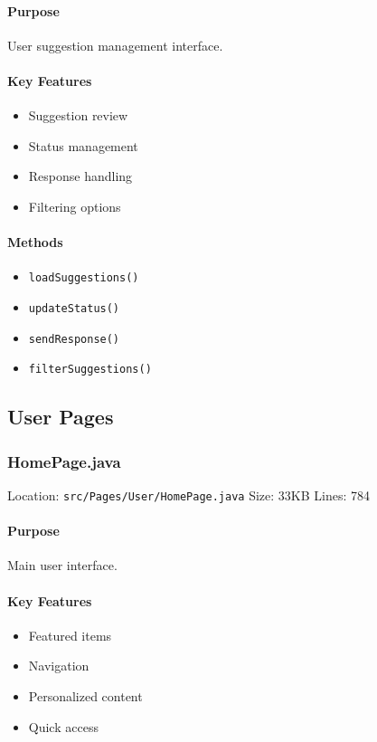 \documentclass[12pt,a4paper]{article}
\begin{document}
\paragraph{Purpose}
User suggestion management interface.

\paragraph{Key Features}
\begin{itemize}
    \item Suggestion review
    \item Status management
    \item Response handling
    \item Filtering options
\end{itemize}

\paragraph{Methods}
\begin{itemize}
    \item \texttt{loadSuggestions()}
    \item \texttt{updateStatus()}
    \item \texttt{sendResponse()}
    \item \texttt{filterSuggestions()}
\end{itemize}

\subsection{User Pages}
\subsubsection{HomePage.java}
Location: \texttt{src/Pages/User/HomePage.java}
Size: 33KB
Lines: 784

\paragraph{Purpose}
Main user interface.

\paragraph{Key Features}
\begin{itemize}
    \item Featured items
    \item Navigation
    \item Personalized content
    \item Quick access
\end{itemize}
\end{document}
